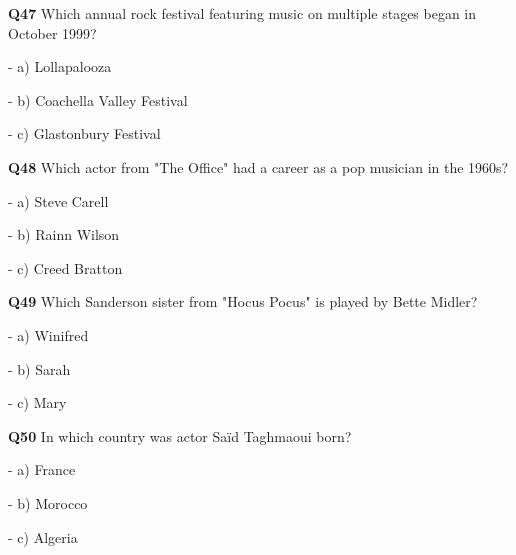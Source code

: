 \textbf{Q47} Which annual rock festival featuring music on multiple stages began in October 1999?\par
\quad - a) Lollapalooza\par
\quad - b) Coachella Valley Festival\par
\quad - c) Glastonbury Festival\par

\textbf{Q48} Which actor from "The Office" had a career as a pop musician in the 1960s?\par
\quad - a) Steve Carell\par
\quad - b) Rainn Wilson\par
\quad - c) Creed Bratton\par

\textbf{Q49} Which Sanderson sister from "Hocus Pocus" is played by Bette Midler?\par
\quad - a) Winifred\par
\quad - b) Sarah\par
\quad - c) Mary\par

\textbf{Q50} In which country was actor Saïd Taghmaoui born?\par
\quad - a) France\par
\quad - b) Morocco\par
\quad - c) Algeria\par